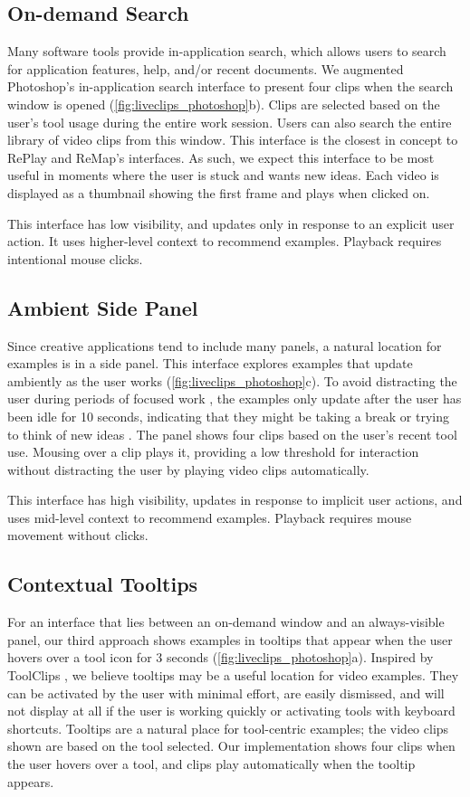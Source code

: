 \subsection{On-demand Search}
Many software tools provide in-application search, which allows users to search for application features, help, and/or recent documents. We augmented Photoshop's in-application search interface to present four clips when the search window is opened (\autoref{fig:liveclips_photoshop}b). Clips are selected based on the user's tool usage during the entire work session. Users can also search the entire library of video clips from this window. This interface is the closest in concept to RePlay and ReMap's interfaces. As such, we expect this interface to be most useful in moments where the user is stuck and wants new ideas. Each video is displayed as a thumbnail showing the first frame and plays when clicked on.

This interface has low visibility, and updates only in response to an explicit user action. It uses higher-level context to recommend examples. Playback requires intentional mouse clicks.

\subsection{Ambient Side Panel}
Since creative applications tend to include many panels, a natural location for examples is in a side panel. This interface explores examples that update ambiently as the user works (\autoref{fig:liveclips_photoshop}c). To avoid distracting the user during periods of focused work \cite{Chan2017}, the examples only update after the user has been idle for 10 seconds, indicating that they might be taking a break or trying to think of new ideas \cite{Siangliulue2015}. The panel shows four clips based on the user's recent tool use. Mousing over a clip plays it, providing a low threshold for interaction without distracting the user by playing video clips automatically.

This interface has high visibility, updates in response to implicit user actions, and uses mid-level context to recommend examples. Playback requires mouse movement without clicks.

\subsection{Contextual Tooltips}
For an interface that lies between an on-demand window and an always-visible panel, our third approach shows examples in tooltips that appear when the user hovers over a tool icon for 3 seconds (\autoref{fig:liveclips_photoshop}a). Inspired by ToolClips \cite{Grossman2010a}, we believe tooltips may be a useful location for video examples. They can be activated by the user with minimal effort, are easily dismissed, and will not display at all if the user is working quickly or activating tools with keyboard shortcuts.
Tooltips are a natural place for tool-centric examples; the video clips shown are based on the tool selected. Our implementation shows four clips when the user hovers over a tool, and clips play automatically when the tooltip appears.

